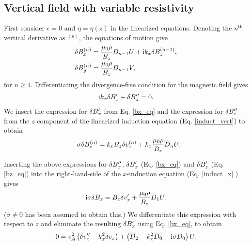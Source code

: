 \subsection{Vertical field with variable resistivity}
First consider $\epsilon = 0$ and $\eta=\eta(z)$ in the linearized
equations. Denoting the $n^\mathrm{th}$ vertical derivative as $^{(n)}$, the
equations of motion give
\begin{align}
  &\delta B_x^{(n)} = \frac{\mu_0\rho}{B_z}D_{n-1}U + \mathrm{i} k_x \delta B_z^{(n-1)},\label{bx_eq}\\
  &\delta B_y^{(n)} = \frac{\mu_0\rho}{B_z}D_{n-1}V,\label{by_eq}
\end{align}
for $n\geq1$. Differentiating the divergence-free condition for the magnetic
field gives
\begin{align}
  \mathrm{i} k_x \delta B_x^{\prime} + \delta B_z^{\prime\prime} = 0.   
\end{align}
We insert the expression for $\delta B_x^\prime$ from Eq. \ref{bx_eq} and the
expression for $\delta B_z^{\prime\prime}$ from the $z$ component of the
linearized induction equation (Eq. \ref{induct_vert}) to obtain
\begin{align}\label{bz_eq}
  -\sigma\delta B_z^{(n)} = k_x B_z \delta v_x^{(n)} + k_x\frac{\mu_0\rho}{B_z}\overline{D}_nU. 
\end{align}

Inserting the above expressions for $\delta B_x^{\prime\prime}$,
$\delta B_x^\prime$ (Eq. \ref{bx_eq}) and $\delta B_z^\prime$  (Eq. \ref{bz_eq})
into the right-hand-side of the $x$-induction equation (Eq. \ref{induct_x} ) gives   
\begin{align}
  \mathrm{i}\sigma \delta B_x =
  B_z\delta v_x^\prime + \frac{\mu_0\rho}{B_z}\overline{D}_1U. \label{bx_expression}
\end{align}
($\bar{\sigma}\neq0$ has been assumed to obtain this.) We
differentiate this expression with respect to $z$ and eliminate the
resulting $\delta B_x^\prime$ using Eq. \ref{bx_eq}, to obtain
\begin{align}
  0 = v_A^2\left(\delta v_x^{\prime\prime} -
  k_x^2\delta v_x\right) + \left(\overline{D}_2 - k_x^2 \overline{D}_0
    - \mathrm{i}\sigma D_0\right)U. \label{final_vx} 
\end{align}

